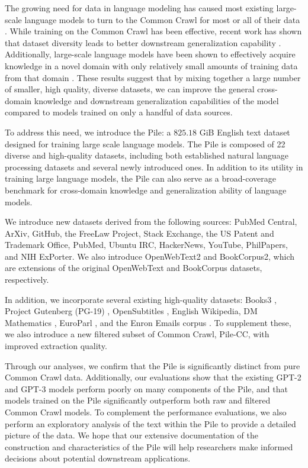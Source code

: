\documentclass[11pt,a4paper]{article}
\begin{document}
The growing need for data in language modeling has caused most existing large-scale language models to turn to the Common Crawl for most or all of their data \citep{GPT3,T5}. While training on the Common Crawl has been effective, recent work has shown that dataset diversity leads to better downstream generalization capability \citep{TuringNLG}. Additionally, large-scale language models have been shown to effectively acquire knowledge in a novel domain with only relatively small amounts of training data from that domain \citep{TuringNLG,GPT3,extractingtrainingdata}. These results suggest that by mixing together a large number of smaller, high quality, diverse datasets, we can improve the general cross-domain knowledge and downstream generalization capabilities of the model compared to models trained on only a handful of data sources.


To address this need, we introduce the Pile: a $825.18$ GiB English text dataset designed for training large scale language models. The Pile is composed of 22 diverse and high-quality datasets, including both established natural language processing datasets and several newly introduced ones. In addition to its utility in training large language models, the Pile can also serve as a broad-coverage benchmark for cross-domain knowledge and generalization ability of language models.

We introduce new datasets derived from the following sources: PubMed Central, ArXiv, GitHub, the FreeLaw Project, Stack Exchange, the US Patent and Trademark Office, PubMed, Ubuntu IRC, HackerNews, YouTube, PhilPapers, and NIH ExPorter. We also introduce OpenWebText2 and BookCorpus2, which are extensions of the original OpenWebText \citep{OpenWeb} and BookCorpus \citep{BookCorpus,BookCorpusCode} datasets, respectively.

In addition, we incorporate several existing high-quality datasets: Books3 \citep{bibliotik}, Project Gutenberg (PG-19) \citep{PG19}, OpenSubtitles \citep{OpenSubtitles}, English Wikipedia, DM Mathematics \citep{dm-mathematics}, EuroParl \citep{EuroParl}, and the Enron Emails corpus \citep{Enron}. To supplement these, we also introduce a new filtered subset of Common Crawl, Pile-CC, with improved extraction quality.

Through our analyses, we confirm that the Pile is significantly distinct from pure Common Crawl data. Additionally, our evaluations show that the existing GPT-2 and GPT-3 models perform poorly on many components of the Pile, and that models trained on the Pile significantly outperform both raw and filtered Common Crawl models. To complement the performance evaluations, we also perform an exploratory analysis of the text within the Pile to provide a detailed picture of the data. We hope that our extensive documentation of the construction and characteristics of the Pile will help researchers make informed decisions about potential downstream applications.
\end{document}
